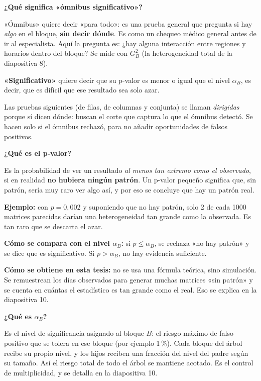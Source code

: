 \documentclass[11pt,a4paper]{article}
\newcommand{\cajainicio}[3]{\par\medskip\noindent
  \begin{lrbox}{\cajabox}\begin{minipage}{\dimexpr\linewidth-2\fboxsep-2\fboxrule\relax}%
  \textbf{\color{#1}#3}\par\smallskip}
\newcommand{\cajafin}[2]{\end{minipage}\end{lrbox}\fcolorbox{#1}{#2}{\usebox{\cajabox}}\par\medskip}
\newenvironment{nota}[1]{\cajainicio{acc}{acc!7}{#1}}{\cajafin{acc}{acc!7}}
\begin{document}
\begin{nota}{¿Qué significa «ómnibus significativo»?}
«Ómnibus» quiere decir «para todo»: es una prueba general que pregunta si hay \emph{algo} en el bloque, \textbf{sin decir dónde}. Es como un chequeo médico general antes de ir al especialista. Aquí la pregunta es: ¿hay alguna interacción entre regiones y horarios dentro del bloque? Se mide con $G^2_B$ (la heterogeneidad total de la diapositiva 8).

\textbf{«Significativo»} quiere decir que su p-valor es menor o igual que el nivel $\alpha_B$, es decir, que es difícil que ese resultado sea solo azar.

Las pruebas siguientes (de filas, de columnas y conjunta) se llaman \emph{dirigidas} porque sí dicen dónde: buscan el corte que captura lo que el ómnibus detectó. Se hacen solo si el ómnibus rechazó, para no añadir oportunidades de falsos positivos.
\end{nota}

\begin{nota}{¿Qué es el p-valor?}
Es la probabilidad de ver un resultado \emph{al menos tan extremo como el observado}, si en realidad \textbf{no hubiera ningún patrón}. Un p-valor pequeño significa que, sin patrón, sería muy raro ver algo así, y por eso se concluye que hay un patrón real.

\textbf{Ejemplo:} con $p=0{,}002$ y suponiendo que no hay patrón, solo 2 de cada 1000 matrices parecidas darían una heterogeneidad tan grande como la observada. Es tan raro que se descarta el azar.

\textbf{Cómo se compara con el nivel $\alpha_B$:} si $p\le\alpha_B$, se rechaza «no hay patrón» y se dice que es significativo. Si $p>\alpha_B$, no hay evidencia suficiente.

\textbf{Cómo se obtiene en esta tesis:} no se usa una fórmula teórica, sino simulación. Se remuestrean los días observados para generar muchas matrices «sin patrón» y se cuenta en cuántas el estadístico es tan grande como el real. Eso se explica en la diapositiva 10.
\end{nota}

\begin{nota}{¿Qué es $\alpha_B$?}
Es el nivel de significancia asignado al bloque $B$: el riesgo máximo de falso positivo que se tolera en ese bloque (por ejemplo 1\,\%). Cada bloque del árbol recibe su propio nivel, y los hijos reciben una fracción del nivel del padre según su tamaño. Así el riesgo total de todo el árbol se mantiene acotado. Es el control de multiplicidad, y se detalla en la diapositiva 10.
\end{nota}
\end{document}
